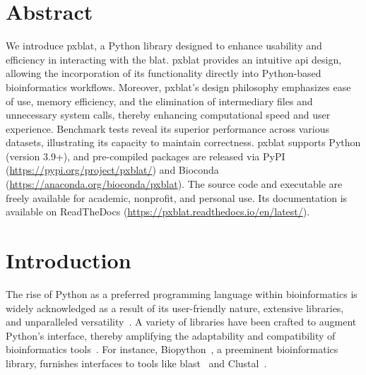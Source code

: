 \documentclass[10pt,letterpaper]{article}
\begin{document}
\section*{Abstract}
We introduce \gls{pxblat}, a Python library designed to enhance usability and efficiency in interacting with the \gls{blat}.
\gls{pxblat} provides an intuitive \gls{api} design, allowing the incorporation of its functionality directly into Python-based bioinformatics workflows.
Moreover, \gls{pxblat}'s design philosophy emphasizes ease of use, memory efficiency, and the elimination of intermediary files and unnecessary system calls, thereby enhancing computational speed and user experience.
Benchmark tests reveal its superior performance across various datasets, illustrating its capacity to maintain correctness.
\gls{pxblat} supports Python (version 3.9+), and pre-compiled packages are released via PyPI (\url{https://pypi.org/project/pxblat/}) and Bioconda (\url{https://anaconda.org/bioconda/pxblat}).
The source code and executable are freely available for academic, nonprofit, and personal use.
Its documentation is available on ReadTheDocs (\url{https://pxblat.readthedocs.io/en/latest/}).


\linenumbers

\section*{Introduction}
The rise of Python as a preferred programming language within bioinformatics is widely acknowledged as a result of its user-friendly nature, extensive libraries, and unparalleled versatility~\cite{perkel2015programming}.
A variety of libraries have been crafted to augment Python's interface, thereby amplifying the adaptability and compatibility of bioinformatics tools~\cite{putri2022analysing, cock2009biopython}.
For instance, Biopython~\cite{cock2009biopython}, a preeminent bioinformatics library, furnishes interfaces to tools like \gls{blast}~\cite{altschul1990basic} and Clustal~\cite{higgins1988clustal}.
\end{document}
